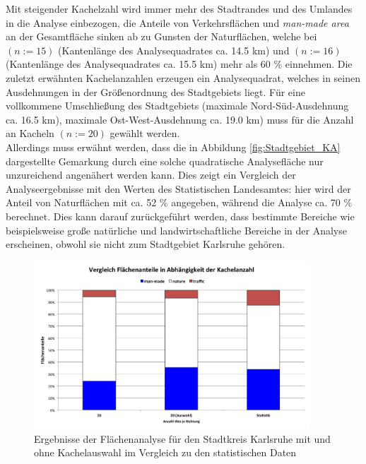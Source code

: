 %
Mit steigender Kachelzahl wird immer mehr des Stadtrandes und des Umlandes in die Analyse einbezogen, die Anteile von Verkehrsflächen und \textit{man-made area} an der Gesamtfläche sinken ab zu Gunsten der Naturflächen, welche bei  \((n:=15)\) (Kantenlänge des Analysequadrates ca. \num{14.5} \si{\kilo\metre}) und  \((n:=16)\) (Kantenlänge des Analysequadrates ca. \num{15.5} \si{\kilo\metre}) mehr als \num{60} \% einnehmen. Die zuletzt erwähnten Kachelanzahlen erzeugen ein Analysequadrat, welches in seinen Ausdehnungen in der Größenordnung des Stadtgebiets liegt. Für eine vollkommene Umschließung des Stadtgebiets (maximale Nord-Süd-Ausdehnung ca. \num{16.5} \si{\kilo\metre}), maximale Ost-West-Ausdehnung ca. \num{19.0} \si{\kilo\metre}) muss für die Anzahl an Kacheln \((n:=20)\) gewählt werden. \\
\newline
Allerdings muss erwähnt werden, dass die in Abbildung \ref{fig:Stadtgebiet_KA} dargestellte Gemarkung durch eine solche quadratische Analysefläche nur unzureichend angenähert werden kann. Dies zeigt ein Vergleich der Analyseergebnisse mit den Werten des Statistischen Landesamtes: hier wird der Anteil von Naturflächen mit ca. \num{52} \% angegeben, während die Analyse ca. \num{70} \% berechnet. Dies kann darauf zurückgeführt werden, dass bestimmte Bereiche wie beispielsweise große natürliche und landwirtschaftliche Bereiche in der Analyse erscheinen, obwohl sie nicht zum Stadtgebiet Karlsruhe gehören.\\
%
\newline
\begin{figure}
  \centering
    \includegraphics[width=0.92\textwidth]{images/3_Kachelvergleich_KA_skip.png}
    \caption{Ergebnisse der Flächenanalyse für den Stadtkreis Karlsruhe mit und ohne Kachelauswahl im Vergleich zu den statistischen Daten}
    \label{fig:Kachel_skip_vgl}
\end{figure}
